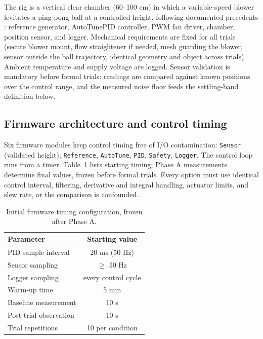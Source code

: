 \documentclass[10pt,twocolumn]{article}
\begin{document}
The rig is a vertical clear chamber (60--100 cm) in which a variable-speed blower levitates a ping-pong ball at a controlled height, following documented precedents \cite{jernigan2009, tkacik2021, zachi2025}: reference generator, AutoTunePID controller, PWM fan driver, chamber, position sensor, and logger. Mechanical requirements are fixed for all trials (secure blower mount, flow straightener if needed, mesh guarding the blower, sensor outside the ball trajectory, identical geometry and object across trials). Ambient temperature and supply voltage are logged. Sensor validation is mandatory before formal trials: readings are compared against known positions over the control range, and the measured noise floor feeds the settling-band definition below.

\subsection{Firmware architecture and control timing}

Six firmware modules keep control timing free of I/O contamination: \texttt{Sensor} (validated height), \texttt{Reference}, \texttt{AutoTune}, \texttt{PID}, \texttt{Safety}, \texttt{Logger}. The control loop runs from a timer. Table~\ref{tab:timing} lists starting timing; Phase A measurements determine final values, frozen before formal trials. Every option must use identical control interval, filtering, derivative and integral handling, actuator limits, and slew rate, or the comparison is confounded.

\begin{table}[t]
\centering
\caption{Initial firmware timing configuration, frozen after Phase A.}
\label{tab:timing}
\small
\begin{tabular}{@{}lc@{}}
\toprule
Parameter & Starting value \\
\midrule
PID sample interval & 20 ms (50 Hz) \\
Sensor sampling & $\ge$ 50 Hz \\
Logger sampling & every control cycle \\
Warm-up time & 5 min \\
Baseline measurement & 10 s \\
Post-trial observation & 10 s \\
Trial repetitions & 10 per condition \\
\bottomrule
\end{tabular}
\end{table}
\end{document}
